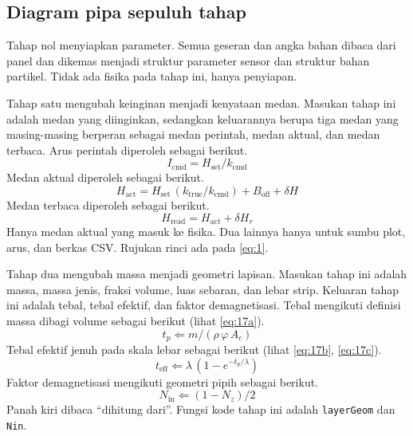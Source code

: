 \documentclass[a4paper,11pt]{article}
\begin{document}
\subsection{Diagram pipa sepuluh tahap}
Tahap nol menyiapkan parameter.
Semua geseran dan angka bahan dibaca dari panel dan dikemas menjadi
struktur parameter sensor dan struktur bahan partikel.
Tidak ada fisika pada tahap ini, hanya penyiapan.

Tahap satu mengubah keinginan menjadi kenyataan medan.
Masukan tahap ini adalah medan yang diinginkan, sedangkan keluarannya
berupa tiga medan yang masing-masing berperan sebagai medan perintah,
medan aktual, dan medan terbaca.
Arus perintah diperoleh sebagai berikut.
\begin{equation*}
I_{\mathrm{cmd}} = H_{\mathrm{set}}/k_{\mathrm{cmd}}
\end{equation*}
Medan aktual diperoleh sebagai berikut.
\begin{equation*}
H_{\mathrm{act}} = H_{\mathrm{set}}\,(k_{\mathrm{true}}/k_{\mathrm{cmd}})
+ B_{\mathrm{off}} + \delta H
\end{equation*}
Medan terbaca diperoleh sebagai berikut.
\begin{equation*}
H_{\mathrm{read}} = H_{\mathrm{act}} + \delta H_{r}
\end{equation*}
Hanya medan aktual yang masuk ke fisika.
Dua lainnya hanya untuk sumbu plot, arus, dan berkas CSV.
Rujukan rinci ada pada \eqref{eq:1}.

Tahap dua mengubah massa menjadi geometri lapisan.
Masukan tahap ini adalah massa, massa jenis, fraksi volume, luas sebaran,
dan lebar strip.
Keluaran tahap ini adalah tebal, tebal efektif, dan faktor demagnetisasi.
Tebal mengikuti definisi massa dibagi volume sebagai berikut
(lihat \eqref{eq:17a}).
\begin{equation*}
t_{p} \Leftarrow m/(\rho\,\varphi\,A_{c})
\end{equation*}
Tebal efektif jenuh pada skala lebar sebagai berikut
(lihat \eqref{eq:17b}, \eqref{eq:17c}).
\begin{equation*}
t_{\mathrm{eff}} \Leftarrow \lambda\,(1-e^{-t_{p}/\lambda})
\end{equation*}
Faktor demagnetisasi mengikuti geometri pipih sebagai berikut.
\begin{equation*}
N_{\mathrm{in}} \Leftarrow (1-N_{z})/2
\end{equation*}
Panah kiri dibaca ``dihitung dari''.
Fungsi kode tahap ini adalah \texttt{layerGeom} dan \texttt{Nin}.
\end{document}
